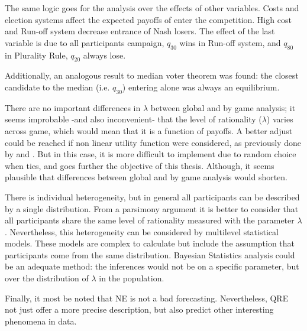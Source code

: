 The same logic goes for the analysis over the effects of other variables. Costs and election systems affect the expected payoffs of enter the competition. High cost and Run-off system decrease entrance of Nash losers. 
The effect of the last variable is due to all participants campaign, $q_{30}$ wins in Run-off system, and $q_{80}$ in Plurality Rule, $q_{20}$ always lose. 

Additionally, an analogous result to median voter theorem was found: the closest candidate to the median (i.e. $q_{30}$) entering alone was always an equilibrium. %

There are no important differences in $\lambda$ between global and by game analysis; it seems improbable -and also inconvenient- that the level of rationality ($\lambda$) varies across game, which would mean that it is a function of payoffs. A better adjust could be reached if non linear utility function were considered, as previously done by  and . But in this case, it is more difficult to implement due to random choice when ties, and goes further the objective of this thesis. Although, it seems plausible that differences between global and by game analysis would shorten. 

There is individual heterogeneity, but in general all participants can be described by a single distribution. From a parsimony argument it is better to consider that all participants share the same level of rationality measured with the parameter $\lambda$. 
Nevertheless, this heterogeneity can be considered by multilevel statistical models. These models are complex to calculate but include the assumption that participants come from the same distribution. 
Bayesian Statistics analysis could be an adequate method: the inferences would not be on a specific parameter, but over the distribution of $\lambda$ in the population.


Finally, it most be noted that NE is not a bad forecasting. Nevertheless, QRE not just offer a more precise description, but also predict other interesting phenomena in data.